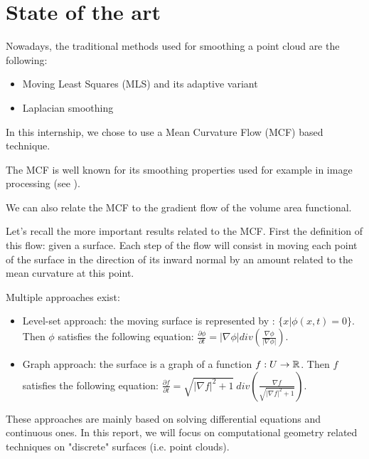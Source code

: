 \chapter{State of the art}


Nowadays, the traditional methods used for smoothing a point cloud are the
following:
\begin{itemize}
    \item Moving Least Squares (MLS) and its adaptive variant
    \item Laplacian smoothing
\end{itemize}

In this internship, we chose to use a Mean Curvature Flow (MCF) based technique.

The MCF is well known for its smoothing properties used for example in image
processing (see \cite{ciomaga2010level}).

We can also relate the MCF to the gradient flow of the volume area functional.

Let's recall the more important results related to the MCF.  First the
definition of this flow: given a surface. Each step of the flow will consist in
moving each point of the surface in the direction of its inward normal by an
amount related to the mean curvature at this point.

Multiple approaches exist:
\begin{itemize}
    \item Level-set approach: the moving surface is represented by : $ \{ x |
        \phi(x, t) = 0 \} $. Then $ \phi $ satisfies the following equation: $
        \frac{\partial \phi}{\partial t} = |\nabla \phi| div(\frac{\nabla
            \phi}{| \nabla \phi |}) $.
    \item Graph approach: the surface is a graph of a function $ f : U
        \rightarrow \mathbb{R} $. Then $ f $ satisfies the following equation: $
        \frac{\partial f}{\partial t} = \sqrt{|\nabla f|^2 + 1} ~div(\frac{\nabla
        f}{\sqrt{|\nabla f|^2 + 1}}) $.
\end{itemize}

These approaches are mainly based on solving differential equations and
continuous ones. In this report, we will focus on computational geometry related
techniques on "discrete" surfaces (i.e. point clouds).

